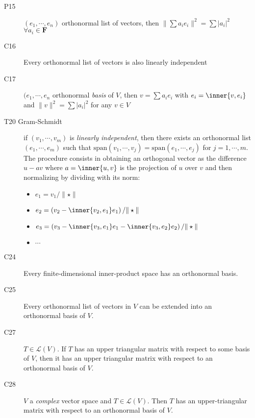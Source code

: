 \begin{description}
\item[P15] $(e_1,\cdots,e_n)$ orthonormal list of vectors, then $\|\sum a_i e_i\|^2 = \sum |a_i|^2$ $\forall a_i\in\mathbf{F}$

\item[C16] Every orthonormal list of vectors is also linearly independent

\item[C17]  $(e_1,\cdots,e_n$ orthonormal \emph{basis} of $V$, then $v = \sum a_i e_i$ with $e_i=\inner{v,e_i}$ and $\|v\|^2 =\sum |a_i|^2 $ for any $v\in V$

\item[T20 Gram-Schmidt\label{itm:T6_gram_schmidt}] if $(v_1,\cdots,v_m)$ is \emph{linearly independent}, then there exists an orthonormal list $(e_1,\cdots,e_m)$ such that $\mathrm{span}(v_1,\cdots,v_j)=\mathrm{span}(e_1,\cdots,e_j)$ for $j=1,\cdots,m$. The procedure consists in obtaining an orthogonal vector as the difference $u-av$ where $a=\inner{u,v}$ is the projection of $u$ over $v$ and then normalizing by dividing with its norm:
\begin{itemize}
\item $e_1 = v_1/\|\star\|$
\item $e_2 = \left(v_2 - \inner{v_2, e_1}e_1\right)/\|\star\|$
\item $e_3 = \left(v_3 - \inner{v_3, e_1}e_1- \inner{v_3, e_2}e_2\right)/\|\star\|$
\item $\cdots$
\end{itemize}

\item[C24] Every finite-dimensional inner-product space has an orthonormal basis.

\item[C25] Every orthonormal list of vectors in $V$ can be extended into an orthonormal basis of $V$.

\item[C27] $T\in\mathcal{L}(V)$. If $T$ has an upper triangular matrix with respect to some basis of $V$, then it has an upper triangular matrix with respect to an orthonormal basis of $V$.

\item[C28] $V$ a \emph{complex} vector space and $T\in\mathcal{L}(V)$. Then $T$ has an upper-triangular matrix with respect to an orthonormal basis of $V$. 


\end{description}
